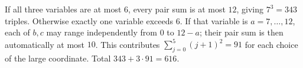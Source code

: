 If all three variables are at most $6$, every pair sum is at most $12$, giving $7^3=343$ triples. Otherwise exactly one variable exceeds $6$. If that variable is $a=7,\ldots,12$, each of $b,c$ may range independently from $0$ to $12-a$; their pair sum is then automatically at most $10$. This contributes $\sum_{j=0}^5(j+1)^2=91$ for each choice of the large coordinate. Total $343+3\cdot91=\boxed{616}$.
